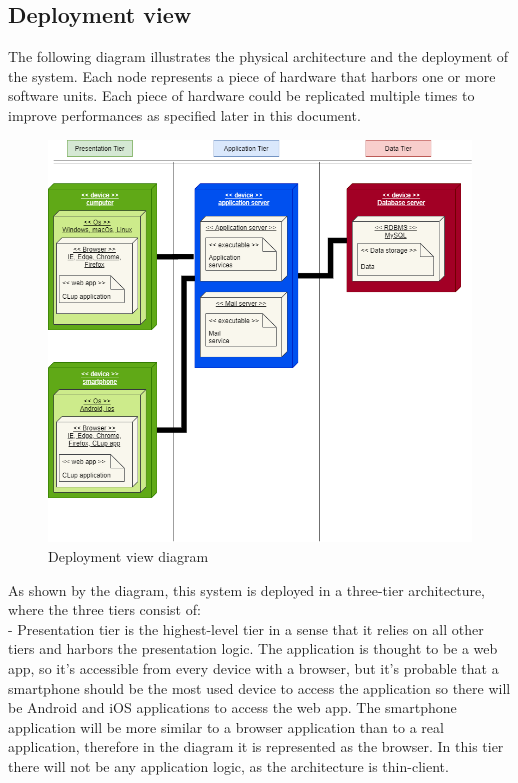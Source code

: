 \subsection{Deployment view}
The following diagram illustrates the physical architecture and the
deployment of the system.
Each node represents a piece of hardware that harbors one or more software units.
Each piece of hardware could be replicated multiple times to improve performances as specified later in this document.

\begin{figure}[H]
    \centering
    \hspace*{-3.5cm}
    \includegraphics[height=0.7\textwidth]{Images/TierDiagram.png}
    \caption{Deployment view diagram}
\end{figure}

As shown by the diagram, this system is deployed in a three-tier
architecture, where the three tiers consist of: \\

- Presentation tier is the highest-level tier in a sense that it relies on all other tiers and harbors the presentation logic.
The application is thought to be a web app, so it's accessible from every device with a browser, but it's probable that
a smartphone should be the most used device to access the application so there will be Android and iOS applications to access
the web app.
The smartphone application will be more similar to a browser application than to a real application, therefore in the diagram it is represented as the browser.
In this tier there will not be any application logic, as the architecture is thin-client.\\

